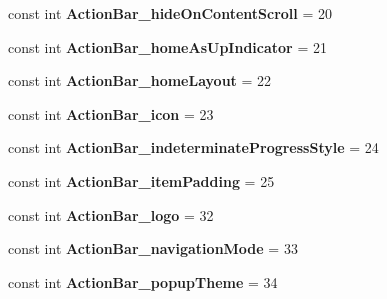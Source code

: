 \begin{DoxyCompactItemize}
const int {\bfseries Action\+Bar\+\_\+hide\+On\+Content\+Scroll} = 20
\item 
\mbox{\label{classst_delivery_1_1_resource_1_1_styleable_a36c043b4b1fdb15759ba99389e8d7aa7}} 
const int {\bfseries Action\+Bar\+\_\+home\+As\+Up\+Indicator} = 21
\item 
\mbox{\label{classst_delivery_1_1_resource_1_1_styleable_a2d52a6bede45ab9ca808847d0c4cd291}} 
const int {\bfseries Action\+Bar\+\_\+home\+Layout} = 22
\item 
\mbox{\label{classst_delivery_1_1_resource_1_1_styleable_a7cf477f04dc738c80afacd790b59888d}} 
const int {\bfseries Action\+Bar\+\_\+icon} = 23
\item 
\mbox{\label{classst_delivery_1_1_resource_1_1_styleable_a60fb6908e6aa24f865e50def02b06ebc}} 
const int {\bfseries Action\+Bar\+\_\+indeterminate\+Progress\+Style} = 24
\item 
\mbox{\label{classst_delivery_1_1_resource_1_1_styleable_ac2af7b6e7fd4ac4d77dbdfcdf3b812b0}} 
const int {\bfseries Action\+Bar\+\_\+item\+Padding} = 25
\item 
\mbox{\label{classst_delivery_1_1_resource_1_1_styleable_adbe9cf5291c340295d5116a1bfff8c63}} 
const int {\bfseries Action\+Bar\+\_\+logo} = 32
\item 
\mbox{\label{classst_delivery_1_1_resource_1_1_styleable_a83563958c5d600943e211194fcb33a9f}} 
const int {\bfseries Action\+Bar\+\_\+navigation\+Mode} = 33
\item 
\mbox{\label{classst_delivery_1_1_resource_1_1_styleable_af41ca7f600dc3f85c1fe8b5de93ec6c6}} 
const int {\bfseries Action\+Bar\+\_\+popup\+Theme} = 34
\item 
\mbox{\label{classst_delivery_1_1_resource_1_1_styleable_a68b79dbabf2b8cd851a0b72a6613d96a}} 

\end{DoxyCompactItemize}
